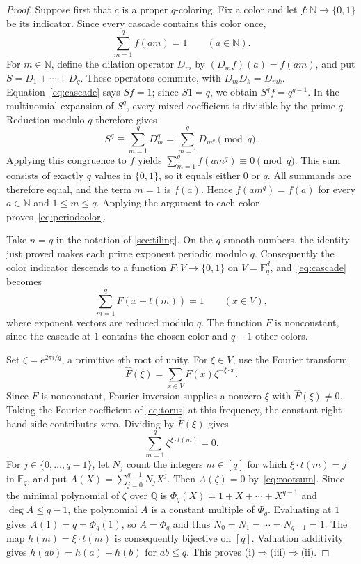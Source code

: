 \documentclass[11pt,reqno]{amsart}
\newcommand{\N}{\mathbb N}
\newcommand{\Q}{\mathbb Q}
\newcommand{\F}{\mathbb F}
\theoremstyle{definition}
\theoremstyle{remark}
\numberwithin{equation}{section}
\begin{document}
\begin{proof}
Suppose first that $c$ is a proper $q$-coloring. Fix a color and let
$f:\N\to\{0,1\}$ be its indicator. Since every cascade contains this
color once,
\begin{equation}\label{eq:cascade}
 \sum_{m=1}^{q}f(am)=1\qquad(a\in\N).
\end{equation}
For $m\in\N$, define the dilation operator $D_m$ by $(D_mf)(a)=f(am)$,
and put $S=D_1+\cdots+D_q$. These operators commute, with
$D_mD_k=D_{mk}$. Equation~\eqref{eq:cascade} says $Sf=1$; since
$S1=q$, we obtain $S^qf=q^{q-1}$.
In the multinomial expansion of $S^q$, every mixed coefficient is
divisible by the prime $q$. Reduction modulo $q$ therefore gives
\[
 S^q\equiv\sum_{m=1}^q D_m^q
      =\sum_{m=1}^q D_{m^q}\pmod q.
\]
Applying this congruence to $f$ yields
$\sum_{m=1}^q f(am^q)\equiv0\pmod q$. This sum consists of exactly
$q$ values in $\{0,1\}$, so it equals either $0$ or $q$.
All summands are therefore equal, and the term $m=1$ is $f(a)$.
Hence $f(am^q)=f(a)$ for every $a\in\N$ and $1\le m\le q$.
Applying the argument to each color proves~\eqref{eq:periodcolor}.

Take $n=q$ in the notation of \cref{sec:tiling}. On the $q$-smooth numbers,
the identity just proved makes each prime exponent periodic modulo $q$.
Consequently the color indicator descends to a function
$F:V\to\{0,1\}$ on $V=\F_q^d$, and~\eqref{eq:cascade} becomes
\begin{equation}\label{eq:torus}
 \sum_{m=1}^q F(x+t(m))=1\qquad(x\in V),
\end{equation}
where exponent vectors are reduced modulo $q$. The function $F$ is
nonconstant, since the cascade at $1$ contains the chosen color and
$q-1$ other colors.

Set $\zeta=e^{2\pi i/q}$, a primitive $q$th root of unity. For $\xi\in V$,
use the Fourier transform
\[
 \widehat F(\xi)=\sum_{x\in V}F(x)\zeta^{-\xi\cdot x}.
\]
Since $F$ is nonconstant, Fourier inversion supplies a nonzero $\xi$
with $\widehat F(\xi)\ne0$. Taking the Fourier coefficient of
\eqref{eq:torus} at this frequency, the constant right-hand side
contributes zero. Dividing by $\widehat F(\xi)$ gives
\begin{equation}\label{eq:rootsum}
 \sum_{m=1}^q\zeta^{\xi\cdot t(m)}=0.
\end{equation}
For $j\in\{0,\ldots,q-1\}$, let $N_j$ count the integers $m\in[q]$
for which $\xi\cdot t(m)=j$ in $\F_q$, and put
$A(X)=\sum_{j=0}^{q-1}N_jX^j$. Then $A(\zeta)=0$
by~\eqref{eq:rootsum}. Since the minimal polynomial of $\zeta$ over
$\Q$ is $\Phi_q(X)=1+X+\cdots+X^{q-1}$ and $\deg A\le q-1$,
the polynomial $A$ is a constant multiple of $\Phi_q$. Evaluating at
$1$ gives $A(1)=q=\Phi_q(1)$, so $A=\Phi_q$ and thus
$N_0=N_1=\cdots=N_{q-1}=1$. The map $h(m)=\xi\cdot t(m)$ is
consequently bijective on $[q]$. Valuation additivity gives
$h(ab)=h(a)+h(b)$ for $ab\le q$. This proves
\textup{(i)}$\Rightarrow$\textup{(iii)}$\Rightarrow$\textup{(ii)}.


\end{proof}
\end{document}
